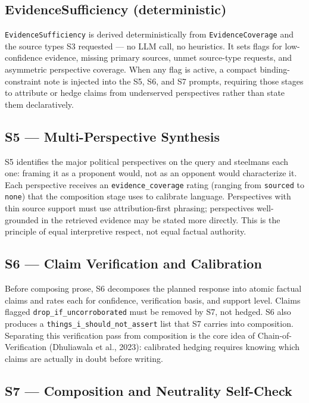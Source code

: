 \documentclass[11pt,letterpaper]{article}
\newcommand{\code}[1]{\texttt{\small #1}}
\begin{document}
\subsection{EvidenceSufficiency (deterministic)}

\code{EvidenceSufficiency} is derived deterministically from
\code{EvidenceCoverage} and the source types S3 requested --- no LLM call,
no heuristics. It sets flags for low-confidence evidence, missing primary
sources, unmet source-type requests, and asymmetric perspective coverage. When
any flag is active, a compact binding-constraint note is injected into the
S5, S6, and S7 prompts, requiring those stages to attribute or hedge claims
from underserved perspectives rather than state them declaratively.

\subsection{S5 --- Multi-Perspective Synthesis}

S5 identifies the major political perspectives on the query and steelmans each
one: framing it as a proponent would, not as an opponent would characterize it.
Each perspective receives an \code{evidence\_coverage} rating (ranging from
\texttt{sourced} to \texttt{none}) that the composition stage uses to calibrate
language. Perspectives with thin source support must use attribution-first
phrasing; perspectives well-grounded in the retrieved evidence may be stated
more directly. This is the principle of equal interpretive respect, not equal
factual authority.

\subsection{S6 --- Claim Verification and Calibration}

Before composing prose, S6 decomposes the planned response into atomic factual
claims and rates each for confidence, verification basis, and support level.
Claims flagged \code{drop\_if\_uncorroborated} must be removed by S7, not
hedged. S6 also produces a \code{things\_i\_should\_not\_assert} list that
S7 carries into composition. Separating this verification pass from composition
is the core idea of Chain-of-Verification (Dhuliawala et al., 2023): calibrated
hedging requires knowing which claims are actually in doubt before writing.

\subsection{S7 --- Composition and Neutrality Self-Check}
\end{document}
